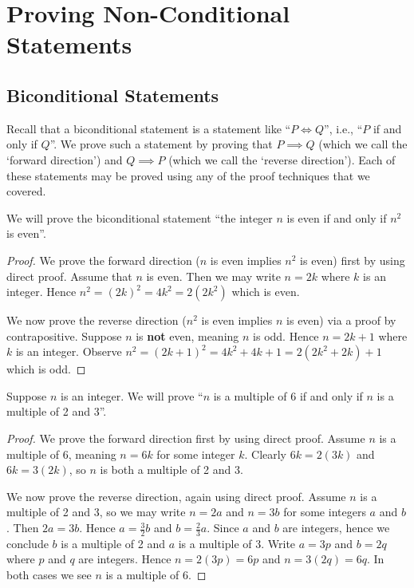 \section{Proving Non-Conditional Statements}
\subsection{Biconditional Statements}
Recall that a biconditional statement is a statement like ``$P \iff Q$'', i.e., ``$P$ if and only if $Q$''. We prove such a statement by proving that $P \implies Q$ (which we call the `forward direction') and $Q \implies P$ (which we call the `reverse direction'). Each of these statements may be proved using any of the proof techniques that we covered.

\begin{example}
    We will prove the biconditional statement ``the integer $n$ is even if and only if $n^2$ is even''.
    \begin{proof}
        We prove the forward direction ($n$ is even implies $n^2$ is even) first by using direct proof. Assume that $n$ is even. Then we may write $n = 2k$ where $k$ is an integer. Hence $n^2 = (2k)^2 = 4k^2 = 2(2k^2)$ which is even.

        We now prove the reverse direction ($n^2$ is even implies $n$ is even) via a proof by contrapositive. Suppose $n$ is \textbf{not} even, meaning $n$ is odd. Hence $n = 2k + 1$ where $k$ is an integer. Observe $n^2 = (2k+1)^2 = 4k^2 + 4k + 1 = 2(2k^2 + 2k) + 1$ which is odd.
    \end{proof}
\end{example}

\begin{example}
    Suppose $n$ is an integer. We will prove ``$n$ is a multiple of 6 if and only if $n$ is a multiple of 2 and 3''.
    \begin{proof}
        We prove the forward direction first by using direct proof. Assume $n$ is a multiple of 6, meaning $n = 6k$ for some integer $k$. Clearly $6k = 2(3k)$ and $6k = 3(2k)$, so $n$ is both a multiple of 2 and 3.
        
        We now prove the reverse direction, again using direct proof. Assume $n$ is a multiple of 2 and 3, so we may write $n = 2a$ and $n = 3b$ for some integers $a$ and $b$. Then $2a = 3b$. Hence $a = \frac 32 b$ and $b = \frac 23 a$. Since $a$ and $b$ are integers, hence we conclude $b$ is a multiple of 2 and $a$ is a multiple of 3. Write $a = 3p$ and $b = 2q$ where $p$ and $q$ are integers. Hence $n = 2(3p) = 6p$ and $n = 3(2q) = 6q$. In both cases we see $n$ is a multiple of 6.
    \end{proof}
\end{example}

